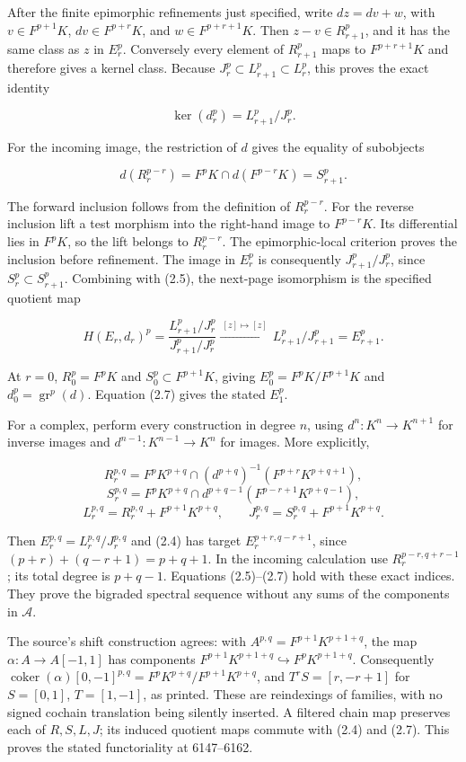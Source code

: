 After the finite epimorphic refinements just specified, write \(dz=dv+w\), with \(v\in F^{p+1}K\), \(dv\in F^{p+r}K\), and \(w\in F^{p+r+1}K\). Then \(z-v\in R_{r+1}^p\), and it has the same class as \(z\) in \(E_r^p\). Conversely every element of \(R_{r+1}^p\) maps to \(F^{p+r+1}K\) and therefore gives a kernel class. Because \(J_r^p\subset L_{r+1}^p\subset L_r^p\), this proves the exact identity

\[
\ker(d_r^p)=L_{r+1}^p/J_r^p.            \tag{2.5}
\]

For the incoming image, the restriction of \(d\) gives the equality of subobjects

\[
d(R_r^{p-r})=F^pK\cap d(F^{p-r}K)=S_{r+1}^p.       \tag{2.6}
\]

The forward inclusion follows from the definition of \(R_r^{p-r}\). For the reverse inclusion lift a test morphism into the right-hand image to \(F^{p-r}K\). Its differential lies in \(F^pK\), so the lift belongs to \(R_r^{p-r}\). The epimorphic-local criterion proves the inclusion before refinement. The image in \(E_r^p\) is consequently \(J_{r+1}^p/J_r^p\), since \(S_r^p\subset S_{r+1}^p\). Combining with (2.5), the next-page isomorphism is the specified quotient map

\[
H(E_r,d_r)^p
=\frac{L_{r+1}^p/J_r^p}{J_{r+1}^p/J_r^p}
\xrightarrow{\ [z]\mapsto[z]\ }
L_{r+1}^p/J_{r+1}^p=E_{r+1}^p.          \tag{2.7}
\]

At \(r=0\), \(R_0^p=F^pK\) and \(S_0^p\subset F^{p+1}K\), giving \(E_0^p=F^pK/F^{p+1}K\) and \(d_0^p=\operatorname{gr}^p(d)\). Equation (2.7) gives the stated \(E_1^p\).

For a complex, perform every construction in degree \(n\), using \(d^n:K^n\to K^{n+1}\) for inverse images and \(d^{n-1}:K^{n-1}\to K^n\) for images. More explicitly,

\[
R_r^{p,q}=F^pK^{p+q}\cap(d^{p+q})^{-1}(F^{p+r}K^{p+q+1}),
\] \[
S_r^{p,q}=F^pK^{p+q}\cap d^{p+q-1}(F^{p-r+1}K^{p+q-1}),
\] \[
L_r^{p,q}=R_r^{p,q}+F^{p+1}K^{p+q},\qquad
J_r^{p,q}=S_r^{p,q}+F^{p+1}K^{p+q}.
\]

Then \(E_r^{p,q}=L_r^{p,q}/J_r^{p,q}\) and (2.4) has target \(E_r^{p+r,q-r+1}\), since \((p+r)+(q-r+1)=p+q+1\). In the incoming calculation use \(R_r^{p-r,q+r-1}\); its total degree is \(p+q-1\). Equations (2.5)--(2.7) hold with these exact indices. They prove the bigraded spectral sequence without any sums of the components in \(\mathcal A\).

The source's shift construction agrees: with \(A^{p,q}=F^{p+1}K^{p+1+q}\), the map \(\alpha:A\to A[-1,1]\) has components \(F^{p+1}K^{p+1+q}\hookrightarrow F^pK^{p+1+q}\). Consequently \(\operatorname{coker}(\alpha)[0,-1]^{p,q}
=F^pK^{p+q}/F^{p+1}K^{p+q}\), and \(T^rS=[r,-r+1]\) for \(S=[0,1]\), \(T=[1,-1]\), as printed. These are reindexings of families, with no signed cochain translation being silently inserted. A filtered chain map preserves each of \(R,S,L,J\); its induced quotient maps commute with (2.4) and (2.7). This proves the stated functoriality at 6147--6162.


